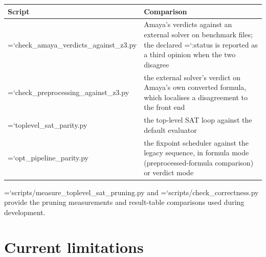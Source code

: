 \documentclass[10pt,a4paper]{article}
\newcommand{\amaya}{Amaya}
\newcommand{\code}[1]{{\small\ttfamily\hyphenchar\font=`\-\relax #1}}
\begin{document}
\begin{center}
\footnotesize
\begin{tabular}{p{42mm}p{102mm}}
\toprule
Script & Comparison \\
\midrule
\code{check\_\allowbreak amaya\_\allowbreak verdicts\_\allowbreak against\_\allowbreak z3.\allowbreak py} & \amaya{}'s verdicts against an external solver on benchmark files; the declared \code{:status} is reported as a third opinion when the two disagree \\
\code{check\_\allowbreak preprocessing\_\allowbreak against\_\allowbreak z3.\allowbreak py} & the external solver's verdict on \amaya{}'s own converted formula, which localises a disagreement to the front end \\
\code{toplevel\_sat\_parity.py} & the top-level SAT loop against the default evaluator \\
\code{opt\_pipeline\_parity.py} & the fixpoint scheduler against the legacy sequence, in formula mode (preprocessed-formula comparison) or verdict mode \\
\bottomrule
\end{tabular}
\end{center}

\code{scripts/measure\_\allowbreak toplevel\_\allowbreak sat\_\allowbreak pruning.py} and \code{scripts/check\_correctness.py} provide the
pruning measurements and result-table comparisons used during development.

\section{Current limitations}
\label{sec:limitations}
\end{document}

